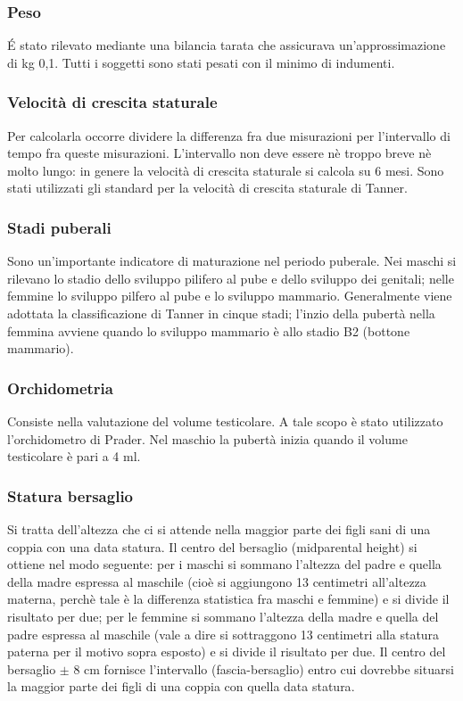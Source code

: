   
\subsubsection*{Peso}
 \'E stato rilevato mediante una bilancia tarata che assicurava un'approssimazione di kg 0,1. Tutti i soggetti sono stati pesati con il minimo di indumenti.

\subsubsection*{Velocità di crescita staturale}
Per calcolarla occorre dividere la differenza fra due misurazioni per l'intervallo di tempo fra queste misurazioni. L'intervallo non deve essere nè troppo breve nè molto lungo: in genere la velocità di crescita staturale si calcola su 6 mesi. Sono stati utilizzati gli standard per la velocità di crescita staturale di Tanner\cite{tanner1966standards}.

\subsubsection*{Stadi puberali}
Sono un'importante indicatore di maturazione nel periodo puberale. Nei maschi si rilevano lo stadio dello sviluppo pilifero al pube e dello sviluppo dei genitali; nelle femmine lo sviluppo pilfero al pube e lo sviluppo mammario. Generalmente viene adottata la classificazione di Tanner\cite{tanner1990foetus} in cinque stadi; l'inzio della pubertà nella femmina avviene quando lo sviluppo mammario è allo stadio B2 (bottone mammario). 

\subsubsection*{Orchidometria}
Consiste nella valutazione del volume testicolare. A tale scopo è stato utilizzato l'orchidometro di Prader. Nel maschio la pubertà inizia quando il volume testicolare è pari a 4 ml.  


\subsubsection*{Statura bersaglio}
Si tratta dell'altezza che ci si attende nella maggior parte dei figli sani di una coppia con una data statura. Il centro del bersaglio (midparental height) si ottiene nel modo seguente: per i maschi si sommano l'altezza del padre e quella della madre espressa al maschile (cioè si aggiungono 13 centimetri all'altezza materna, perchè tale è la differenza statistica fra maschi e femmine) e si divide il risultato per due; per le femmine si sommano l'altezza della madre e quella del padre espressa al maschile (vale a dire si sottraggono 13 centimetri alla statura paterna per il motivo sopra esposto) e si divide il risultato per due. 
Il centro del bersaglio $\pm$ 8 cm fornisce l'intervallo (fascia-bersaglio) entro cui dovrebbe situarsi la maggior parte dei figli di una coppia con quella data statura\cite{tanner1990foetus}.


